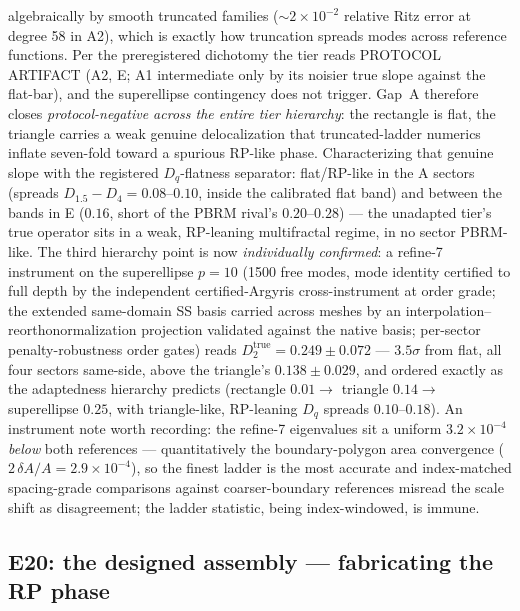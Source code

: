 \documentclass[11pt]{article}
\begin{document}
algebraically by smooth truncated families ($\sim$$2\times10^{-2}$
relative Ritz error at degree 58 in A2), which is exactly how truncation
spreads modes across reference functions. Per the preregistered
dichotomy the tier reads PROTOCOL ARTIFACT (A2, E; A1 intermediate only
by its noisier true slope against the flat-bar), and the superellipse
contingency does not trigger. Gap~A therefore closes
\emph{protocol-negative across the entire tier hierarchy}: the rectangle
is flat, the triangle carries a weak genuine delocalization that
truncated-ladder numerics inflate seven-fold toward a spurious RP-like
phase. Characterizing that genuine slope with the registered
$D_q$-flatness separator: flat/RP-like in the A sectors (spreads
$D_{1.5}-D_4 = 0.08$--$0.10$, inside the calibrated flat band) and
between the bands in E ($0.16$, short of the PBRM rival's
$0.20$--$0.28$) --- the unadapted tier's true operator sits in a weak,
RP-leaning multifractal regime, in no sector PBRM-like. The third
hierarchy point is now \emph{individually confirmed}: a refine-7
instrument on the superellipse $p=10$ (1500 free modes, mode identity
certified to full depth by the independent certified-Argyris
cross-instrument at order grade; the extended same-domain SS basis
carried across meshes by an interpolation--reorthonormalization
projection validated against the native basis; per-sector
penalty-robustness order gates) reads
$D_2^{\mathrm{true}}=0.249\pm0.072$ --- $3.5\sigma$ from flat, all four
sectors same-side, above the triangle's $0.138\pm0.029$, and ordered
exactly as the adaptedness hierarchy predicts (rectangle $0.01\to$
triangle $0.14\to$ superellipse $0.25$, with triangle-like, RP-leaning
$D_q$ spreads $0.10$--$0.18$). An instrument note worth recording: the
refine-7 eigenvalues sit a uniform $3.2\times10^{-4}$ \emph{below} both
references --- quantitatively the boundary-polygon area convergence
($2\,\delta A/A = 2.9\times10^{-4}$), so the finest ladder is the most
accurate and index-matched spacing-grade comparisons against
coarser-boundary references misread the scale shift as disagreement;
the ladder statistic, being index-windowed, is immune.

\subsection{E20: the designed assembly --- fabricating the RP phase}
\label{sec:e20}
\end{document}
